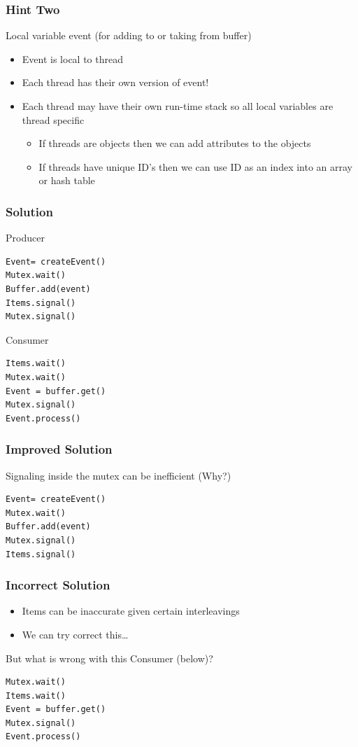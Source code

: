 \documentclass{beamer}
\begin{document}
\begin{frame}[fragile]
	\frametitle{Hint Two}
Local variable event (for adding to or taking from buffer)
\begin{itemize}
	\item Event is local to thread
	\item Each thread has their own version of event!
	\item Each thread may have their own run-time stack so all local variables are thread specific
	\begin{itemize}
	\item If threads are objects then we can add attributes to the objects
	\item If threads have unique ID’s then we can use ID as an index into an array or hash table
	\end{itemize}
\end{itemize}
\end{frame}

\begin{frame}[fragile]
	\frametitle{Solution}
	Producer
\begin{verbatim}
Event= createEvent()
Mutex.wait()
Buffer.add(event)
Items.signal()
Mutex.signal()
\end{verbatim}
Consumer
\begin{verbatim}
Items.wait()
Mutex.wait()
Event = buffer.get()
Mutex.signal()
Event.process()
\end{verbatim}
\end{frame}

\begin{frame}[fragile]
	\frametitle{Improved Solution}
	Signaling inside the mutex can be inefficient (Why?)
\begin{verbatim}
Event= createEvent()
Mutex.wait()
Buffer.add(event)
Mutex.signal()
Items.signal()
\end{verbatim}
\end{frame}

\begin{frame}[fragile]
	\frametitle{Incorrect Solution}
	\begin{itemize}
	\item Items can be inaccurate given certain interleavings
	\item We can try correct this…
	\end{itemize}

But what is wrong with this Consumer (below)?
\begin{verbatim}
Mutex.wait()
Items.wait()
Event = buffer.get()
Mutex.signal()
Event.process()
\end{verbatim}
\end{frame}
\end{document}
